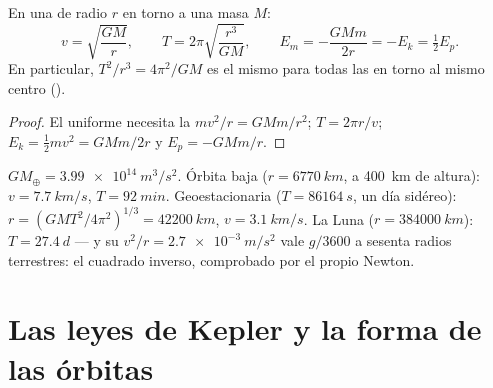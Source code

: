 \begin{theorem}\label{thm:b1:central-forces:circular}
En una  de radio $r$ en torno a una masa $M$:
\[
v = \sqrt{\frac{GM}{r}}, \qquad
T = 2\pi\sqrt{\frac{r^3}{GM}}, \qquad
E_m = -\frac{GMm}{2r} = -E_k = \tfrac12 E_p .
\]
En particular, $T^2/r^3 = 4\pi^2/GM$ es el mismo para todas las  en torno al mismo centro ().
\end{theorem}

\begin{proof}
El  uniforme necesita la  $mv^2/r = GMm/r^2$;
$T = 2\pi r/v$; $E_k = \tfrac12 mv^2 = GMm/2r$ y $E_p = -GMm/r$.
\end{proof}

\begin{example}\label{ex:b1:central-forces:orbits}
$GM_\oplus = \qty{3.99e14}{m^3/s^2}$. Órbita baja ($r = \qty{6770}{km}$,
a \qty{400}{km} de altura): $v = \qty{7.7}{km/s}$, $T = \qty{92}{min}$.
Geoestacionaria ($T = \qty{86164}{s}$, un día sidéreo): $r = (GMT^2/4\pi^2)^{1/3} =
\qty{42200}{km}$, $v = \qty{3.1}{km/s}$. La Luna ($r = \qty{384000}{km}$):
$T = \qty{27.4}{d}$ --- y su  $v^2/r =
\qty{2.7e-3}{m/s^2}$ vale $g/3600$ a sesenta radios terrestres: el
cuadrado inverso, comprobado por el propio Newton.
\end{example}

\section{Las leyes de Kepler y la forma de las órbitas}

